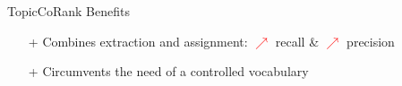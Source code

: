\begin{frame}{TopicCoRank}
  Benefits
  \begin{itemize}
    \item[+]{Combines extraction and assignment: \textcolor{red}{$\nearrow$} recall \& \textcolor{red}{$\nearrow$} precision}
    \item[+]{Circumvents the need of a controlled vocabulary}
  \end{itemize}
  
  \vspace{1em}
  
\end{frame}
